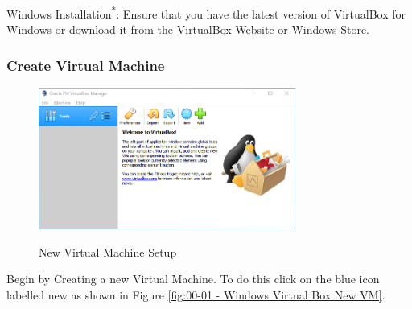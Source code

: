 Windows Installation\textsuperscript{*}: Ensure that you have the latest version
of VirtualBox for Windows or download it from the \href{http://www.google.com}{VirtualBox Website} or
Windows Store.

\let\thefootnote\relax{}

\subsubsection{Create Virtual Machine}
\begin{figure}[!htb]
    \centering
    \includegraphics[width=0.752\textwidth]{images/Win00-00.png}\\[0cm]  
    \caption[Windows Virtual Box]{New Virtual Machine Setup}
    \label{fig:00-01 - Windows Virtual Box New VM} 
\end{figure}
Begin by Creating a new Virtual Machine. To do this click on the blue icon
labelled new as shown in Figure \vref{fig:00-01 - Windows Virtual Box New VM}.

